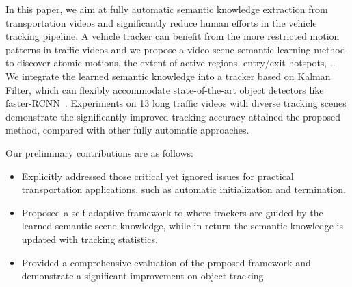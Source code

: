 In this paper, we aim at fully automatic semantic knowledge extraction from transportation videos and
significantly reduce human efforts in the vehicle tracking pipeline.
A vehicle tracker can benefit from the more restricted motion patterns in traffic videos and we propose a video scene semantic learning method to discover atomic motions, the extent of active regions,
entry/exit hotspots, \etc..
We integrate the learned semantic knowledge into a tracker based on Kalman Filter,
which can flexibly accommodate state-of-the-art object detectors like faster-RCNN~\cite{renNIPS15fasterrcnn}.
Experiments on 13 long traffic videos with diverse tracking scenes demonstrate the significantly improved tracking accuracy attained the proposed method, compared with other fully automatic approaches.


Our preliminary contributions are as follows:
\begin{itemize}%
    \item Explicitly addressed those critical yet ignored issues for practical transportation applications, such as automatic initialization and termination.
    \item Proposed a self-adaptive framework to where trackers are guided by the learned semantic scene knowledge, while in return the semantic knowledge is updated with tracking statistics.
    \item Provided a comprehensive evaluation of the proposed framework and demonstrate a significant improvement on object tracking.
\end{itemize}


